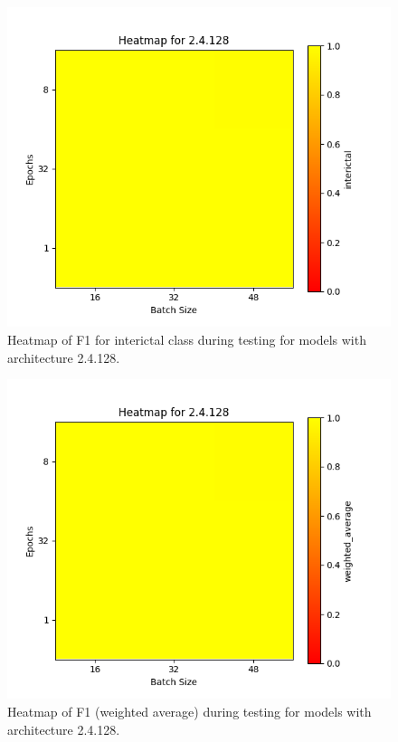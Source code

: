\documentclass[12pt]{article}
\begin{document}
\begin{figure}[H]
\includegraphics[width=\textwidth]{heatmap_f1_interictal_2.4.128}
\centering
\caption{Heatmap of F1 for interictal class during testing for models with architecture 2.4.128.}
\label{fig:time-metrics}
\end{figure}

\begin{figure}[H]
\includegraphics[width=\textwidth]{heatmap_f1_weighted_average_2.4.128}
\centering
\caption{Heatmap of F1 (weighted average) during testing for models with architecture 2.4.128.}
\label{fig:time-metrics}
\end{figure}
\end{document}
